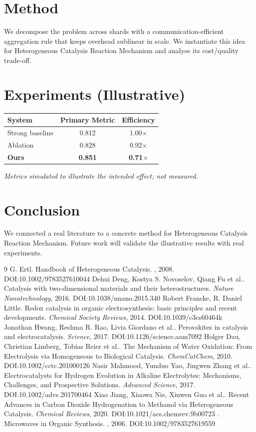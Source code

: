 \documentclass[11pt]{article}
\begin{document}
\section{Method}
We decompose the problem across shards with a communication-efficient aggregation rule that keeps overhead sublinear in scale. We instantiate this idea for Heterogeneous Catalysis Reaction Mechanism and analyse its cost/quality trade-off.

\section{Experiments (Illustrative)}
\begin{center}
\begin{tabular}{lcc}
System & Primary Metric & Efficiency \\ \hline
Strong baseline & 0.812 & 1.00$\times$ \\
Ablation & 0.828 & 0.92$\times$ \\
\textbf{Ours} & \textbf{0.851} & \textbf{0.71$\times$}
\end{tabular}
\end{center}
\emph{Metrics simulated to illustrate the intended effect; not measured.}

\section{Conclusion}
We connected a real literature to a concrete method for Heterogeneous Catalysis Reaction Mechanism. Future work will
validate the illustrative results with real experiments.

\begin{thebibliography}{9}
 G. Ertl. Handbook of Heterogeneous Catalysis. \emph{}, 2008. DOI:10.1002/9783527610044
 Dehui Deng, Kostya S. Novoselov, Qiang Fu et al.. Catalysis with two-dimensional materials and their heterostructures. \emph{Nature Nanotechnology}, 2016. DOI:10.1038/nnano.2015.340
 Robert Francke, R. Daniel Little. Redox catalysis in organic electrosynthesis: basic principles and recent developments. \emph{Chemical Society Reviews}, 2014. DOI:10.1039/c3cs60464k
 Jonathan Hwang, Reshma R. Rao, Livia Giordano et al.. Perovskites in catalysis and electrocatalysis. \emph{Science}, 2017. DOI:10.1126/science.aam7092
 Holger Dau, Christian Limberg, Tobias Reier et al.. The Mechanism of Water Oxidation: From Electrolysis via Homogeneous to Biological Catalysis. \emph{ChemCatChem}, 2010. DOI:10.1002/cctc.201000126
 Nasir Mahmood, Yunduo Yao, Jingwen Zhang et al.. Electrocatalysts for Hydrogen Evolution in Alkaline Electrolytes: Mechanisms, Challenges, and Prospective Solutions. \emph{Advanced Science}, 2017. DOI:10.1002/advs.201700464
 Xiao Jiang, Xiaowa Nie, Xinwen Guo et al.. Recent Advances in Carbon Dioxide Hydrogenation to Methanol via Heterogeneous Catalysis. \emph{Chemical Reviews}, 2020. DOI:10.1021/acs.chemrev.9b00723
 . Microwaves in Organic Synthesis. \emph{}, 2006. DOI:10.1002/9783527619559
\end{thebibliography}
\end{document}
